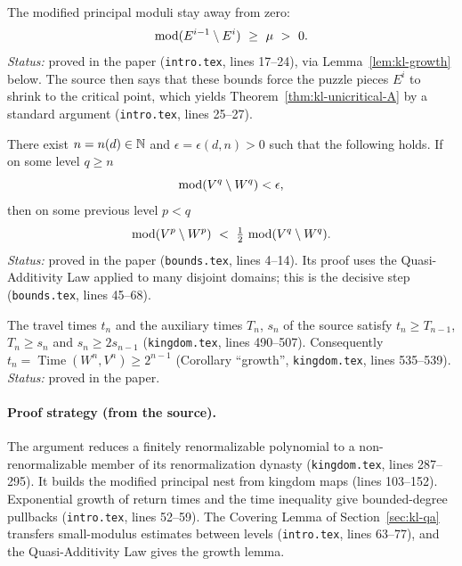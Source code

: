 \begin{theorem}
\label{thm:kl-unicritical-B}
The modified principal moduli stay away from zero:
\[
\modulus(E^{i-1}\setminus E^i)\ \ge\ \mu\ >\ 0.
\]
\emph{Status:} proved in the paper (\texttt{intro.tex}, lines 17--24), via Lemma~\ref{lem:kl-growth} below.  The source
then says that these bounds force the puzzle pieces $E^i$ to shrink to the critical point, which yields
Theorem~\ref{thm:kl-unicritical-A} by a standard argument (\texttt{intro.tex}, lines 25--27).
\end{theorem}

\begin{lemma}
\label{lem:kl-growth}
There exist $n=n(d)\in\mathbb N$ and $\epsilon=\epsilon(d,n)>0$ such that the following holds.  If on some level $q\ge n$
\[
\operatorname{mod}(V^q\setminus W^q)<\epsilon,
\]
then on some previous level $p<q$
\[
\modulus(V^p\setminus W^p)\ <\ \tfrac12\,\modulus(V^q\setminus W^q).
\]
\emph{Status:} proved in the paper (\texttt{bounds.tex}, lines 4--14).  Its proof uses the Quasi-Additivity Law applied to
many disjoint domains; this is the decisive step (\texttt{bounds.tex}, lines 45--68).
\end{lemma}

\begin{lemma}
\label{lem:kl-times}
The travel times $t_n$ and the auxiliary times $T_n$, $s_n$ of the source satisfy $t_n\ge T_{n-1}$, $T_n\ge s_n$ and
$s_n\ge2s_{n-1}$ (\texttt{kingdom.tex}, lines 490--507).  Consequently $t_n=\operatorname{Time}(W^n,V^n)\ge2^{n-1}$
(Corollary ``growth'', \texttt{kingdom.tex}, lines 535--539).  \emph{Status:} proved in the paper.
\end{lemma}

\paragraph{Proof strategy (from the source).}
The argument reduces a finitely renormalizable polynomial to a non-renormalizable member of its renormalization
dynasty (\texttt{kingdom.tex}, lines 287--295).  It builds the modified principal nest from kingdom maps (lines
103--152).  Exponential growth of return times and the time inequality give bounded-degree pullbacks
(\texttt{intro.tex}, lines 52--59).  The Covering Lemma of Section~\ref{sec:kl-qa} transfers small-modulus estimates
between levels (\texttt{intro.tex}, lines 63--77), and the Quasi-Additivity Law gives the growth lemma.

